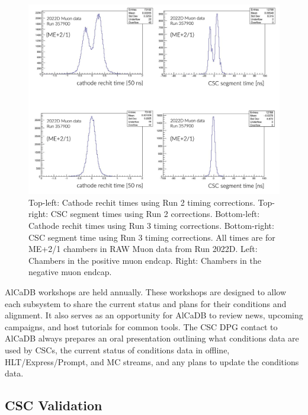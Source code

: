 \begin{figure}[H]
    \centering
    \includegraphics[width=1\textwidth]{Images/DetectorPerformance/TimingStudy/CSCRechitSegmentTimes.png}
    \caption{Top-left: Cathode rechit times using Run 2 timing corrections. Top-right: CSC segment times using Run 2 corrections. Bottom-left: Cathode rechit times using Run 3 timing corrections. Bottom-right: CSC segment time using Run 3 timing corrections. All times are for ME+2/1 chambers in RAW Muon data from Run 2022D. Left: Chambers in the positive muon endcap. Right: Chambers in the negative muon endcap.}
    \label{fig:TimingVal1}
\end{figure}

AlCaDB workshops are held annually. These workshops are designed to allow each subsystem to share the current status and plans for their conditions and alignment. It also serves as an opportunity for AlCaDB to review news, upcoming campaigns, and host tutorials for common tools. The CSC DPG contact to AlCaDB always prepares an oral presentation outlining what conditions data are used by CSCs, the current status of conditions data in offline, HLT/Express/Prompt, and MC streams, and any plans to update the conditions data.

\subsection{CSC Validation}

